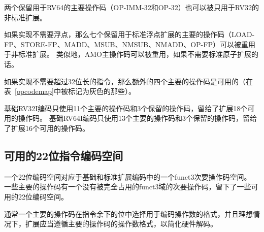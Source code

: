两个保留用于RV64的主要操作码（OP-IMM-32和OP-32）也可以被只用于RV32的非标准扩展。

如果实现不需要浮点，那么七个保留用于标准浮点扩展的主要的操作码（LOAD-FP、STORE-FP、MADD、MSUB、NMSUB、NMADD、OP-FP）可以被重用于非标准扩展。
类似地，AMO主操作码可以被重用，如果不需要标准原子扩展的话。

如果实现不需要超过32位长的指令，那么额外的四个主要的操作码是可用的（在表~\ref{opcodemap}中被标记为灰色的那些）。

基础RV32I编码只使用11个主要的操作码和3个保留的操作码，留给了扩展18个可用的操作码。
基础RV64I编码只使用13个主要的操作码和3个保留的操作码，留给了扩展16个可用的操作码。

\subsection*{可用的22位指令编码空间}

一个22位编码空间对应于基础和标准扩展编码中的一个funct3次要操作码空间。
一些主要的操作码有一个没有被完全占用的funct3域的次要操作码，留下了一些可用的22位编码空间。

通常一个主要的操作码在指令余下的位中选择用于编码操作数的格式，并且理想情况下，扩展应当遵循主要的操作码的操作数格式，以简化硬件解码。

